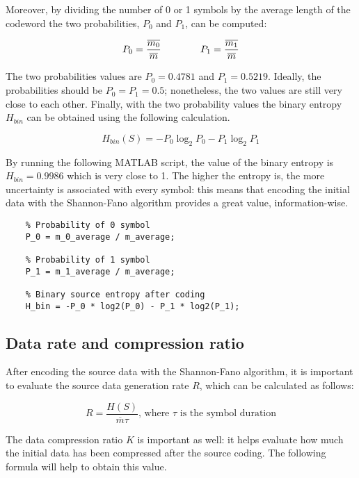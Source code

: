 \noindent Moreover, by dividing the number of 0 or 1 symbols by the average length of the codeword the two probabilities, $P_0$ and $P_1$, can be computed:

\begin{equation*}
    P_0 = \frac{\overline{m_0}}{\overline{m}}
    \hspace*{40px}
    P_1 = \frac{\overline{m_1}}{\overline{m}}
\end{equation*}

\noindent The two probabilities values are $P_0 = 0.4781$ and $P_1 = 0.5219$. Ideally, the probabilities should be $P_0 = P_1 = 0.5$; nonetheless, the two values are still very close to each other. Finally, with the two probability values the binary entropy $H_{bin}$ can be obtained using the following calculation.

\begin{equation*}
    H_{bin}(S) = - P_0\log_2P_0 - P_1\log_2P_1
\end{equation*}

\noindent By running the following MATLAB script, the value of the binary entropy is $H_{bin} = 0.9986$ which is very close to 1. The higher the entropy is, the more uncertainty is associated with every symbol: this means that encoding the initial data with the Shannon-Fano algorithm provides a great value, information-wise.

\begin{lstlisting}
    % Probability of 0 symbol
    P_0 = m_0_average / m_average; 

    % Probability of 1 symbol
    P_1 = m_1_average / m_average; 

    % Binary source entropy after coding
    H_bin = -P_0 * log2(P_0) - P_1 * log2(P_1); 
\end{lstlisting}


\subsection{Data rate and compression ratio}
After encoding the source data with the Shannon-Fano algorithm, it is important to evaluate the source data generation rate $R$, which can be calculated as follows:

\begin{equation*}
    R = \frac{H(S)}{\overline{m}\tau}\text{, where $\tau$ is the symbol duration}
\end{equation*}
 
\noindent The data compression ratio $K$ is important as well: it helps evaluate how much the initial data has been compressed after the source coding. The following formula will help to obtain this value.

